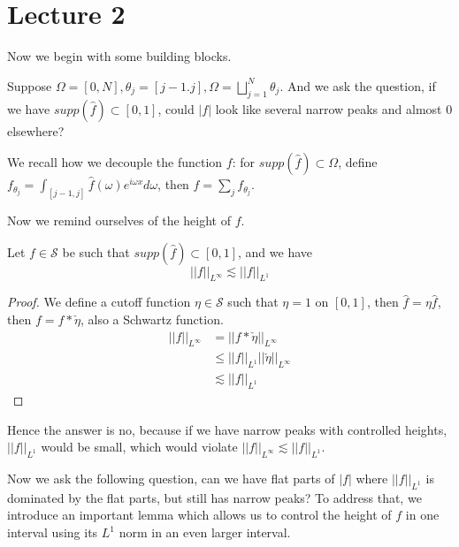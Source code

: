 \section*{Lecture 2}
Now we begin with some building blocks.

Suppose $\Omega=[0,N], \theta_j=[j-1. j], \Omega=\bigsqcup_{j=1}^N\theta_j$. And we ask the question, if we have $supp(\widehat{f})\subset[0,1]$, could $|f|$ look like several narrow peaks and almost 0 elsewhere?

We recall how we decouple the function $f$: for $supp(\widehat{f})\subset\Omega$, define $f_{\theta_j}=\int_{[j-1, j]}\widehat{f}(\omega)e^{i\omega x}d\omega$, then $f=\sum_jf_{\theta_j}$.

Now we remind ourselves of the height of $f$.
\begin{proposition}
    Let $f\in\mathcal{S}$ be such that $supp(\widehat{f})\subset[0,1]$, and we have
    \begin{equation*}
        ||f||_{L^\infty}\lesssim||f||_{L^1}
    \end{equation*}
\end{proposition}
\begin{proof}
    We define a cutoff function $\eta\in\mathcal{S}$ such that $\eta=1$ on $[0,1]$, then $\widehat{f}=\eta\widehat{f}$, then $f=f\ast\check{\eta}$, also a Schwartz function.
\begin{align*}
    ||f||_{L^\infty}&=||f\ast\check{\eta}||_{L^\infty}\\
    &\leq||f||_{L^1}||\check{\eta}||_{L^\infty}\\
    &\lesssim||f||_{L^1}
\end{align*}
\end{proof}
Hence the answer is no, because if we have narrow peaks with controlled heights, $||f||_{L^1}$ would be small, which would violate $||f||_{L^\infty}\lesssim||f||_{L^1}$.

Now we ask the following question, can we have flat parts of $|f|$ where $||f||_{L^1}$ is dominated by the flat parts, but still has narrow peaks? To address that, we introduce an important lemma which allows us to control the height of $f$ in one interval using its $L^1$ norm in an even larger interval.

